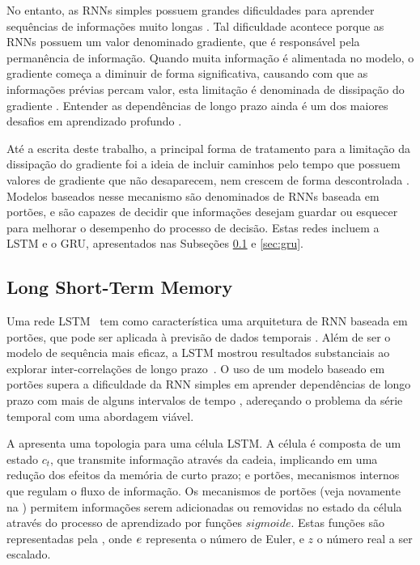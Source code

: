No entanto, as \acrshort{RNN}s simples possuem grandes dificuldades para aprender sequências de informações muito longas \cite{}. Tal dificuldade acontece porque as \acrshort{RNNs} possuem um valor denominado gradiente, que é responsável pela permanência de informação. Quando muita informação é alimentada no modelo, o gradiente começa a diminuir de forma significativa, causando com que as informações prévias percam valor, esta limitação é denominada de dissipação do gradiente \cite{}. Entender as dependências de longo prazo ainda é um dos maiores desafios em aprendizado profundo \cite{deep_learning}.

Até a escrita deste trabalho, a principal forma de tratamento para a limitação da dissipação do gradiente foi a ideia de incluir caminhos pelo tempo que possuem valores de gradiente que não desaparecem, nem crescem de forma descontrolada \cite{deep_learning}. Modelos baseados nesse mecanismo são denominados de \acrshort{RNNs} baseada em portões, e são capazes de decidir que informações desejam guardar ou esquecer para melhorar o desempenho do processo de decisão. Estas redes incluem a \acrlong{LSTM} e o \acrlong{GRU}, apresentados nas Subseções \ref{sec:lstm} e \ref{sec:gru}.

\subsection{Long Short-Term Memory}
\label{sec:lstm}

Uma rede \acrfull{LSTM}~\cite{lstm} tem como característica uma arquitetura de \acrshort{RNN} baseada em portões, que pode ser aplicada à previsão de dados temporais \cite{}. Além de ser o modelo de sequência mais eficaz, a LSTM mostrou resultados substanciais ao explorar inter-correlações de longo prazo~\cite{lstm, deep_learning}. O uso de um modelo baseado em portões supera a dificuldade da \acrshort{RNN} simples em aprender dependências de longo prazo com mais de alguns intervalos de tempo \cite{lstm}, adereçando o problema da série temporal com uma abordagem viável.

%

A  apresenta uma topologia para uma célula LSTM. A célula é composta de um estado $c_t$, que transmite informação através da cadeia, implicando em uma redução dos efeitos da memória de curto prazo; e portões, mecanismos internos que regulam o fluxo de informação. Os mecanismos de portões (veja novamente na ) permitem informações serem adicionadas ou removidas no estado da célula através do processo de aprendizado por funções $sigmoide$. Estas funções são representadas pela , onde $\mathnormal{e}$ representa o número de Euler, e $z$ o número real a ser escalado.

